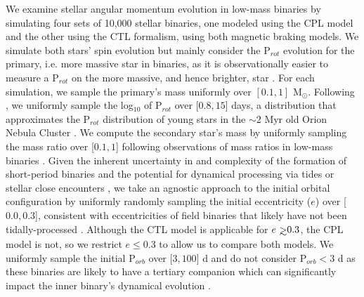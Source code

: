 \documentclass[twocolumn]{aastex61}
\def\gsim{~\rlap{$>$}{\lower 1.0ex\hbox{$\sim$}}}
\begin{document}
We examine stellar angular momentum evolution in low-mass binaries by simulating four sets of 10,000 stellar binaries, one modeled using the CPL model and the other using the CTL formalism, using both magnetic braking models.  We simulate both stars' spin evolution but mainly consider the P$_{rot}$ evolution for the primary, i.e. more massive star in binaries, as it is observationally easier to measure a P$_{rot}$ on the more massive, and hence brighter, star \citep[e.g.][]{Meibom2006,Lurie2017}. For each simulation, we sample the primary's mass uniformly over $[0.1, 1]$ M$_{\odot}$. Following \citet{Matt2015}, we uniformly sample the log$_{10}$ of P$_{rot}$ over [$0.8,15$] days, a distribution that approximates the P$_{rot}$ distribution of young stars in the ${\sim}2$ Myr old Orion Nebula Cluster \citep{Stassun1999,Herbst2001,Herbst2002,Rodriguez-Ledesma2009}.  We compute the secondary star's mass by uniformly sampling the mass ratio over [$0.1, 1$] following observations of mass ratios in low-mass binaries \citep{Raghavan2010,Moe2018}. Given the inherent uncertainty in and complexity of the formation of short-period binaries \citep[e.g.][]{Bonnell1994,Bate2000,Bate2002,Moe2018} and the potential for dynamical processing via tides or stellar close encounters \citep[e.g.][]{Mardling2001,Hurley2002,Ivanova2005,Meibom2005}, we take an agnostic approach to the initial orbital configuration by uniformly randomly sampling the initial eccentricity ($e$) over [$0.0,0.3$], consistent with eccentricities of field binaries that likely have not been tidally-processed \citep{Raghavan2010}. Although the CTL model is applicable for $e \gsim 0.3$, the CPL model is not, so we restrict $e \leq 0.3$ to allow us to compare both models.
We uniformly sample the initial P$_{orb}$ over [$3,100$] d and do not consider P$_{orb} < 3$ d as these binaries are likely to have a tertiary companion \citep{Tokovinin2006} which can significantly impact the inner binary's dynamical evolution \citep[e.g.][]{Munoz2015,Martin2015b,Hamers2016,Moe2018}. 
\end{document}

